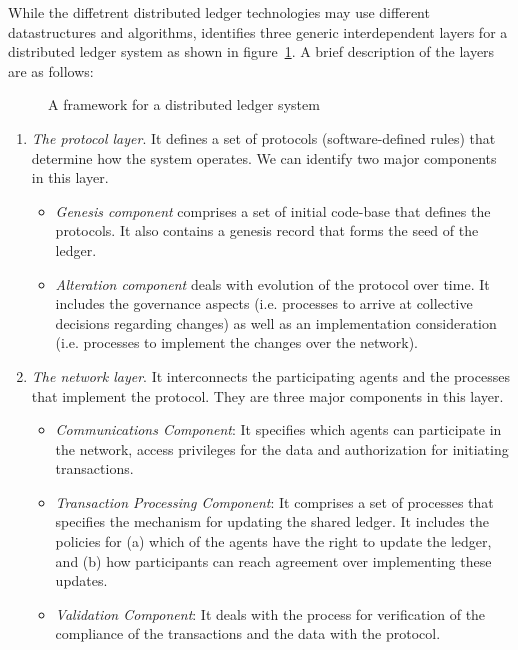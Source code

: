 While the diffetrent distributed ledger technologies may use different datastructures and algorithms, \citep{Rauchs:2018} identifies 
three generic interdependent layers for a distributed ledger system as shown in figure~\ref{fig:ledger:dledger}.  A brief description 
of the layers are as follows:

\begin{figure}[!htbp]
	\centerline{
	}
	\caption{A framework for a distributed ledger system}
	\label{fig:ledger:dledger}
\end{figure}

\begin{enumerate}
	\item{\em The protocol layer}. It defines a set of protocols (software-defined rules) that determine how the system operates. 
		We can identify two major components in this layer. 
		\begin{itemize}
			\item {\em Genesis component} comprises a set of initial code-base that defines the protocols. It also contains 
				a genesis record that forms the seed of the ledger. 
			\item {\em Alteration component} deals with evolution of the protocol over time. It includes the governance 
				aspects (i.e.  processes to arrive at collective decisions regarding changes) as well as an implementation 
				consideration (i.e.  processes to implement the changes over the network).
		\end{itemize}


	\item{\em The network layer}. It interconnects the participating agents and the processes that implement the protocol. 
		They are three major components in this layer.  
		\begin{itemize}
			\item {\em Communications Component}: It specifies which agents can participate in the network, access privileges 
				for the data and authorization for initiating transactions.
			\item {\em Transaction Processing Component}: It comprises a set of processes that specifies the mechanism for
				updating the shared ledger. It includes the policies for (a) which of the agents have the right to 
				update the ledger, and (b) how participants can reach agreement over implementing these updates.
			\item {\em Validation Component}: It deals with the process for verification of the compliance of the transactions 
				and the data with the protocol.  
		\end{itemize}


\end{enumerate}
